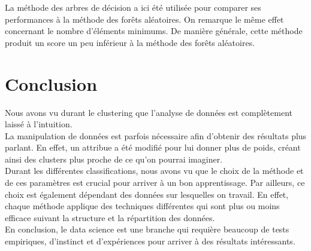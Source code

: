\documentclass[11pt, a4paper]{article}
\begin{document}
La méthode des arbres de décision a ici été utilisée pour comparer ses performances à la méthode des forêts aléatoires.
On remarque le même effet concernant le nombre d'éléments minimums.
De manière générale, cette méthode produit un score un peu inférieur à la méthode des forêts aléatoires.

\newpage

\section{Conclusion}

Nous avons vu durant le clustering que l'analyse de données est complètement laissé à l'intuition. \\
La manipulation de données est parfois nécessaire afin d'obtenir des résultats plus parlant.
En effet, un attribue a été modifié pour lui donner plus de poids,
créant ainsi des clusters plus proche de ce qu'on pourrai imaginer. \\

Durant les différentes classifications,
nous avons vu que le choix de la méthode et de ces paramètres est crucial pour arriver à un bon apprentissage.
Par ailleurs, ce choix est également dépendant des données sur lesquelles on travail.
En effet, chaque méthode applique des techniques différentes qui sont plus ou moins efficace suivant
la structure et la répartition des données. \\

En conclusion, le data science est une branche qui requière beaucoup de tests empiriques,
d'instinct et d'expériences pour arriver à des résultats intéressants.
\end{document}
